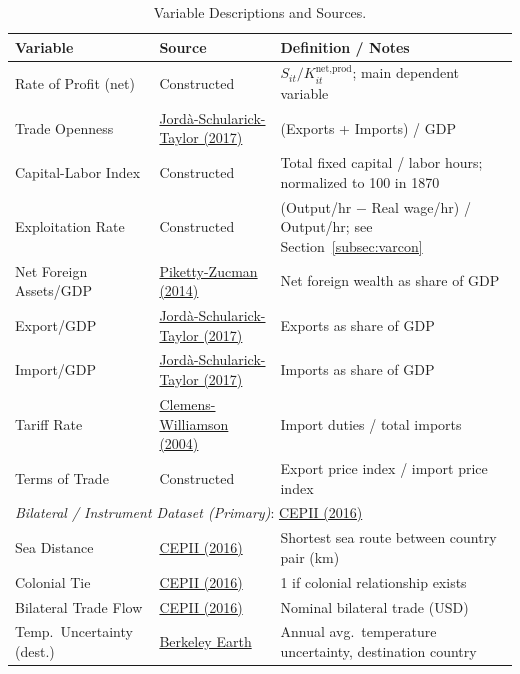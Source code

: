 \documentclass[10pt]{article}
\begin{document}
\begin{table}[!htbp]
\centering
\small
\caption{Variable Descriptions and Sources.}
\label{tab:variables}
\begin{tabular}{p{4.5cm} p{4cm} p{5.5cm}}
\toprule
\textbf{Variable} & \textbf{Source} & \textbf{Definition / Notes} \\
\midrule
Rate of Profit (net) & Constructed & $S_{it}/K^{\text{net,prod}}_{it}$; main dependent variable \\
Trade Openness & \href{https://www.macrohistory.net/database/}{Jord\`{a}-Schularick-Taylor (2017)} & (Exports + Imports) / GDP \\
Capital-Labor Index & Constructed & Total fixed capital / labor hours; normalized to 100 in 1870 \\
Exploitation Rate & Constructed & (Output/hr $-$ Real wage/hr) / Output/hr; see Section~\ref{subsec:varcon} \\
Net Foreign Assets/GDP & \href{http://piketty.pse.ens.fr/capitalisback/}{Piketty-Zucman (2014)} & Net foreign wealth as share of GDP \\
Export/GDP & \href{https://www.macrohistory.net/database/}{Jord\`{a}-Schularick-Taylor (2017)} & Exports as share of GDP \\
Import/GDP & \href{https://www.macrohistory.net/database/}{Jord\`{a}-Schularick-Taylor (2017)} & Imports as share of GDP \\
Tariff Rate & \href{https://scholar.harvard.edu/williamson/publications/roots-american-protectionism}{Clemens-Williamson (2004)} & Import duties / total imports \\
Terms of Trade & Constructed & Export price index / import price index \\
\midrule
\multicolumn{3}{l}{\textit{Bilateral / Instrument Dataset (Primary)}: \href{http://www.cepii.fr/CEPII/en/bdd_modele/bdd_modele_item.asp?id=8}{CEPII (2016)}} \\
Sea Distance & \href{http://www.cepii.fr/CEPII/en/bdd_modele/bdd_modele_item.asp?id=8}{CEPII (2016)} & Shortest sea route between country pair (km) \\
Colonial Tie & \href{http://www.cepii.fr/CEPII/en/bdd_modele/bdd_modele_item.asp?id=8}{CEPII (2016)} & 1 if colonial relationship exists \\
Bilateral Trade Flow & \href{http://www.cepii.fr/CEPII/en/bdd_modele/bdd_modele_item.asp?id=8}{CEPII (2016)} & Nominal bilateral trade (USD) \\
Temp.\ Uncertainty (dest.) & \href{https://berkeleyearth.org/data/}{Berkeley Earth} & Annual avg.\ temperature uncertainty, destination country \\

\end{tabular}
\end{table}
\end{document}

